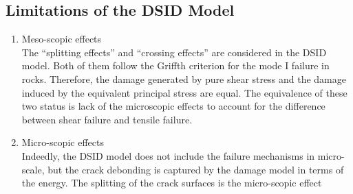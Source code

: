\documentclass[preprint,review,12pt]{elsarticle}
\begin{document}
\subsection{Limitations of the DSID Model}
%
\begin{enumerate}
\item Meso-scopic effects
\
\\
The ``splitting effects'' and ``crossing effects'' are considered in the DSID model. Both of them follow the Griffth criterion for the mode I failure in rocks. Therefore, the damage generated by pure shear stress and the damage induced by the equivalent principal stress are equal. The equivalence of these two status is lack of the microscopic effects to account for the difference between shear failure and tensile failure. 
%
\item Micro-scopic effects
\
\\
Indeedly, the DSID model does not include the failure mechanisms in micro-scale, but the crack debonding is captured by the damage model in terms of the energy. The splitting of the crack surfaces is the micro-scopic effect 
\end{enumerate}

\end{document}

